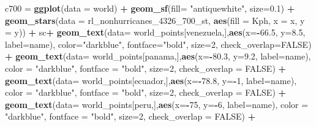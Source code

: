 \documentclass[12pt,oneside]{reedthesis}
\newenvironment{Shaded}{\begin{snugshade}}{\end{snugshade}}
\newcommand{\DataTypeTok}[1]{\textcolor[rgb]{0.13,0.29,0.53}{#1}}
\newcommand{\DecValTok}[1]{\textcolor[rgb]{0.00,0.00,0.81}{#1}}
\newcommand{\FloatTok}[1]{\textcolor[rgb]{0.00,0.00,0.81}{#1}}
\newcommand{\KeywordTok}[1]{\textcolor[rgb]{0.13,0.29,0.53}{\textbf{#1}}}
\newcommand{\NormalTok}[1]{#1}
\newcommand{\OperatorTok}[1]{\textcolor[rgb]{0.81,0.36,0.00}{\textbf{#1}}}
\newcommand{\OtherTok}[1]{\textcolor[rgb]{0.56,0.35,0.01}{#1}}
\newcommand{\StringTok}[1]{\textcolor[rgb]{0.31,0.60,0.02}{#1}}
\begin{document}
\begin{Shaded}
\begin{Highlighting}[]
\NormalTok{c700 =}\StringTok{ }\KeywordTok{ggplot}\NormalTok{(}\DataTypeTok{data =}\NormalTok{ world) }\OperatorTok{+}\StringTok{ }
\StringTok{  }\KeywordTok{geom_sf}\NormalTok{(}\DataTypeTok{fill=} \StringTok{"antiquewhite"}\NormalTok{, }\DataTypeTok{size=}\FloatTok{0.1}\NormalTok{) }\OperatorTok{+}\StringTok{ }
\StringTok{  }\KeywordTok{geom_stars}\NormalTok{(}\DataTypeTok{data =}\NormalTok{ rl_nonhurricanes_}\DecValTok{4326}\NormalTok{_}\DecValTok{700}\NormalTok{_st, }\KeywordTok{aes}\NormalTok{(}\DataTypeTok{fill =}\NormalTok{ Kph, }\DataTypeTok{x =}\NormalTok{ x, }\DataTypeTok{y =}\NormalTok{ y)) }\OperatorTok{+}\StringTok{ }
\StringTok{  }\NormalTok{sc}\OperatorTok{+}
\StringTok{  }\KeywordTok{geom_text}\NormalTok{(}\DataTypeTok{data=}\NormalTok{ world_points[venezuela,],}\KeywordTok{aes}\NormalTok{(}\DataTypeTok{x=}\OperatorTok{-}\FloatTok{66.5}\NormalTok{, }\DataTypeTok{y=}\FloatTok{8.5}\NormalTok{, }\DataTypeTok{label=}\NormalTok{name), }\DataTypeTok{color=}\StringTok{"darkblue"}\NormalTok{, }\DataTypeTok{fontface=}\StringTok{"bold"}\NormalTok{, }\DataTypeTok{size=}\DecValTok{2}\NormalTok{, }\DataTypeTok{check_overlap=}\OtherTok{FALSE}\NormalTok{) }\OperatorTok{+}
\StringTok{  }\KeywordTok{geom_text}\NormalTok{(}\DataTypeTok{data=}\NormalTok{ world_points[panama,],}\KeywordTok{aes}\NormalTok{(}\DataTypeTok{x=}\OperatorTok{-}\FloatTok{80.3}\NormalTok{, }\DataTypeTok{y=}\FloatTok{9.2}\NormalTok{, }\DataTypeTok{label=}\NormalTok{name), }\DataTypeTok{color =} \StringTok{"darkblue"}\NormalTok{, }\DataTypeTok{fontface =} \StringTok{"bold"}\NormalTok{, }\DataTypeTok{size=}\DecValTok{2}\NormalTok{, }\DataTypeTok{check_overlap =} \OtherTok{FALSE}\NormalTok{) }\OperatorTok{+}\StringTok{ }
\StringTok{  }\KeywordTok{geom_text}\NormalTok{(}\DataTypeTok{data=}\NormalTok{ world_points[ecuador,],}\KeywordTok{aes}\NormalTok{(}\DataTypeTok{x=}\OperatorTok{-}\FloatTok{78.8}\NormalTok{, }\DataTypeTok{y=}\OperatorTok{-}\DecValTok{1}\NormalTok{, }\DataTypeTok{label=}\NormalTok{name), }\DataTypeTok{color =} \StringTok{"darkblue"}\NormalTok{, }\DataTypeTok{fontface =} \StringTok{"bold"}\NormalTok{, }\DataTypeTok{size=}\DecValTok{2}\NormalTok{, }\DataTypeTok{check_overlap =} \OtherTok{FALSE}\NormalTok{) }\OperatorTok{+}
\StringTok{  }\KeywordTok{geom_text}\NormalTok{(}\DataTypeTok{data=}\NormalTok{ world_points[peru,],}\KeywordTok{aes}\NormalTok{(}\DataTypeTok{x=}\OperatorTok{-}\DecValTok{75}\NormalTok{, }\DataTypeTok{y=}\OperatorTok{-}\DecValTok{6}\NormalTok{, }\DataTypeTok{label=}\NormalTok{name), }\DataTypeTok{color =} \StringTok{"darkblue"}\NormalTok{, }\DataTypeTok{fontface =} \StringTok{"bold"}\NormalTok{, }\DataTypeTok{size=}\DecValTok{2}\NormalTok{, }\DataTypeTok{check_overlap =} \OtherTok{FALSE}\NormalTok{) }\OperatorTok{+}

\end{Highlighting}
\end{Shaded}
\end{document}
